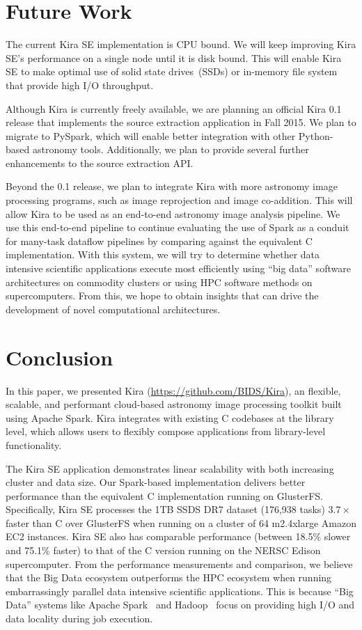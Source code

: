 \documentclass[10pt, conference, compsocconf]{IEEEtran}
\begin{document}
\section{Future Work}
\label{sec:Future}

The current Kira SE implementation is CPU bound. We will keep improving Kira SE's performance
on a single node until it is disk bound. This will enable Kira SE to make optimal use of
solid state drives~(SSDs) or in-memory file system that provide high I/O throughput.

Although Kira is currently freely available, we are planning an official Kira 0.1 release
that implements the source extraction application in Fall 2015.
We plan to migrate to PySpark, which will enable better integration with other
Python-based astronomy tools. Additionally, we plan to provide several further enhancements to
the source extraction API.

Beyond the 0.1 release, we plan to integrate Kira with more astronomy image processing
programs, such as image reprojection and image co-addition. This will allow Kira to be
used as an end-to-end astronomy image analysis pipeline. We use this end-to-end pipeline
to continue evaluating the use of Spark as a conduit for many-task dataflow pipelines by
comparing against the equivalent C implementation. With this system, we will try to determine
whether data intensive scientific applications execute most efficiently using ``big data''
software architectures on commodity clusters or using HPC software methods on supercomputers.
From this, we hope to obtain insights that can drive the development of novel computational
architectures.

\section{Conclusion}
\label{sec:Conclusion}

In this paper, we presented Kira (\url{https://github.com/BIDS/Kira}), an flexible, scalable,
and performant cloud-based astronomy image processing toolkit built using Apache Spark.
Kira integrates with existing C codebases at the library level, which allows users to flexibly
compose applications from library-level functionality.

The Kira SE application demonstrates linear scalability with both increasing cluster and data
size. Our Spark-based implementation delivers better performance than the equivalent C 
implementation running on GlusterFS. Specifically, Kira SE processes the 1TB SSDS DR7 dataset (176,938 tasks)
$3.7\times$ faster than C over GlusterFS when running on a cluster of 64 m2.4xlarge Amazon
EC2 instances. Kira SE also has comparable performance (between 18.5\% slower and 75.1\% faster)
to that of the C version running on the NERSC Edison supercomputer. From the performance
measurements and comparison, we believe that the Big Data ecosystem outperforms the HPC
ecosystem when running embarrassingly parallel data intensive scientific applications. This is
because ``Big Data'' systems like Apache Spark~\cite{zaharia12} and Hadoop~\cite{HADOOP}
focus on providing high I/O and data locality during job execution.
\end{document}
